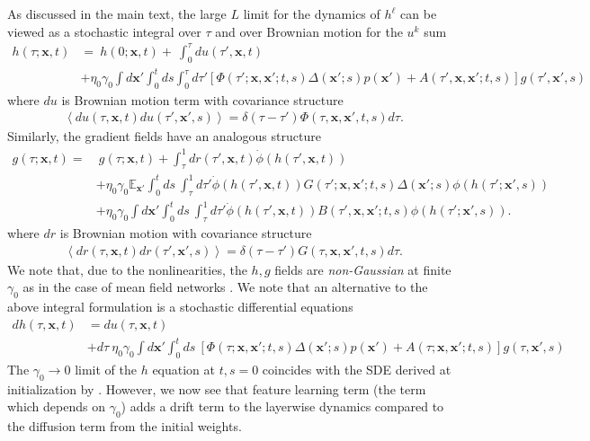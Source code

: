\documentclass{article} %
\def\x{\bm x}
\begin{document}
As discussed in the main text, the large $L$ limit for the dynamics of $h^\ell$ can be viewed as a stochastic integral over $\tau$ and over Brownian motion for the $u^k$ sum 
\begin{align}
    h(\tau;\x,t) &= \ h(0;\x,t) + \ \int_0^\tau du(\tau', \x,t)  \nonumber
    \\
    &+ \eta_0 \gamma_0 \int d\x' \int_0^t ds  \int_0^\tau d\tau' \left[\Phi(\tau';\x,\x';t,s)\Delta(\x';s) p(\x')  + A(\tau',\x,\x';t,s) \right] g(\tau',\x',s)   
\end{align}
where $du$ is Brownian motion term with covariance structure
\begin{align}
    \left< du(\tau,\x,t) du(\tau',\x',s) \right> = \delta(\tau-\tau') \Phi(\tau,\x,\x',t,s) d\tau  .
\end{align}
Similarly, the gradient fields have an analogous structure 
\begin{align}
    g(\tau;\x,t) =& \ g(\tau;\x,t) + \int_\tau^1 dr(\tau', \x,t) \dot\phi(h(\tau',\x,t))  
 \nonumber
    \\
    &+ \eta_0 \gamma_0 \mathbb{E}_{\x'} \int_0^t ds \  \int_{\tau}^1 d\tau' \dot\phi(h(\tau',\x,t)) G(\tau';\x,\x';t,s) \Delta(\x';s)  \phi(h(\tau';\x',s))  \nonumber
    \\
    &+ \eta_0 \gamma_0 \int d\x' \int_0^t ds \  \int_{\tau}^1 d\tau' \dot\phi(h(\tau',\x,t))  B(\tau',\x,\x';t,s)  \phi(h(\tau';\x',s))  .
\end{align}
where $dr$ is Brownian motion with covariance structure  
\begin{align}
    \left< dr(\tau,\x,t) dr(\tau',\x',s) \right> = \delta(\tau-\tau') G(\tau,\x,\x',t,s) d\tau  .
\end{align}
We note that, due to the nonlinearities, the $h, g$ fields are \textit{non-Gaussian} at finite $\gamma_0$ as in the case of mean field networks \cite{bordelon2022self}. We note that an alternative to the above integral formulation is a stochastic differential equations
\begin{align}
    dh(\tau,\x,t) &= du(\tau,\x,t) \nonumber
    \\
    &+  d\tau \  \eta_0 \gamma_0 \int d\x' \int_0^t ds \   [\Phi(\tau;\x,\x';t,s) \Delta(\x';s) p(\x') + A(\tau;\x,\x';t,s)] g(\tau,\x',s)  
\end{align}
The $\gamma_0 \to 0$ limit of the $h$ equation at $t,s = 0$ coincides with the SDE derived at initialization by \cite{hayou2023on, hayou2023width}. However, we now see that feature learning term (the term which depends on $\gamma_0$) adds a drift term to the layerwise dynamics compared to the diffusion term from the initial weights. 
\end{document}
